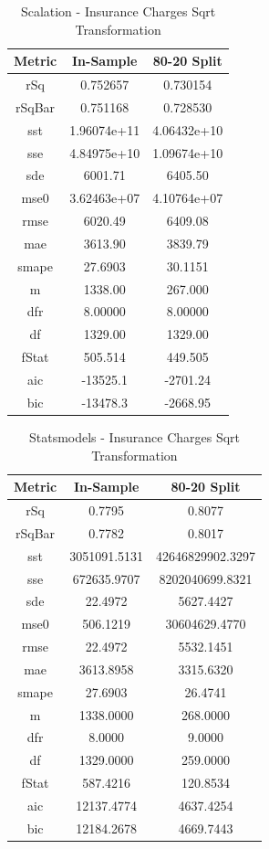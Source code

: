 \documentclass{article}
\begin{document}
\begin{table}[H]
\centering
\caption{Scalation - Insurance Charges Sqrt Transformation}
\label{tab:Scalation - Insurance Charges Sqrt Transformation}
\begin{tabular}{|c|c|c|} \hline 
Metric & In-Sample & 80-20 Split \\ \hline \hline 
rSq &0.752657 & 0.730154 \\ \hline 
rSqBar &0.751168 &      0.728530 \\ \hline 
sst &1.96074e+11 &      4.06432e+10 \\ \hline 
sse &4.84975e+10 &      1.09674e+10 \\ \hline 
sde &6001.71 &  6405.50 \\ \hline 
mse0 &3.62463e+07 &     4.10764e+07 \\ \hline 
rmse &6020.49 & 6409.08 \\ \hline 
mae &3613.90 &  3839.79 \\ \hline 
smape &27.6903 &        30.1151 \\ \hline 
m &1338.00 &    267.000 \\ \hline 
dfr &8.00000 &  8.00000 \\ \hline 
df &1329.00 &   1329.00 \\ \hline 
fStat &505.514 &        449.505 \\ \hline 
aic &-13525.1 & -2701.24 \\ \hline 
bic &-13478.3 & -2668.95 \\ \hline 
\end{tabular}
\end{table}

\begin{table}[H]
\centering
\caption{Statsmodels - Insurance Charges Sqrt Transformation}
\label{tab:Statsmodels - Insurance Charges Sqrt Transformation}
\begin{tabular}{|c|c|c|}\hline
Metric & In-Sample & 80-20 Split \\ \hline \hline
rSq & 0.7795 & 0.8077 \\ \hline
rSqBar & 0.7782 & 0.8017 \\ \hline
sst & 3051091.5131 & 42646829902.3297 \\ \hline
sse & 672635.9707 & 8202040699.8321 \\ \hline
sde & 22.4972 & 5627.4427 \\ \hline
mse0 & 506.1219 & 30604629.4770 \\ \hline
rmse & 22.4972 & 5532.1451 \\ \hline
mae & 3613.8958 & 3315.6320 \\ \hline
smape & 27.6903 & 26.4741 \\ \hline
m & 1338.0000 & 268.0000 \\ \hline
dfr & 8.0000 & 9.0000 \\ \hline
df & 1329.0000 & 259.0000 \\ \hline
fStat & 587.4216 & 120.8534 \\ \hline
aic & 12137.4774 & 4637.4254 \\ \hline
bic & 12184.2678 & 4669.7443 \\ \hline
\end{tabular}
\end{table}
\end{document}

